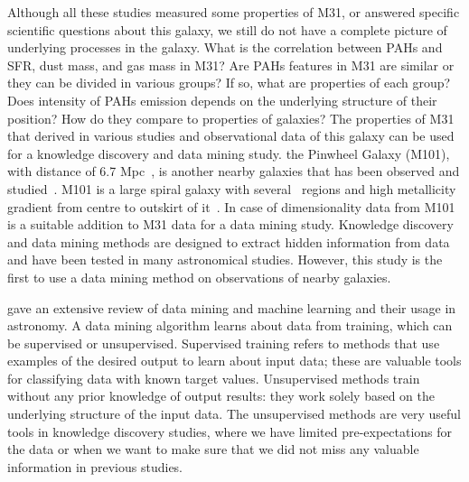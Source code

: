 Although all these studies measured some properties of M31, or answered specific scientific questions about this galaxy, we still do not have a complete picture of underlying processes in the galaxy.
What is the correlation between PAHs and SFR, dust mass, and gas mass in M31? 
Are PAHs features in M31 are similar or they can be divided in various groups? If so, what are properties of each group?
Does intensity of PAHs emission depends on the underlying structure of their position? 
How do they compare to properties of galaxies?
The properties of M31 that derived in various studies and observational data of this galaxy can be used for a knowledge discovery and data mining study.
the Pinwheel Galaxy (M101), with distance of 6.7 Mpc~\citep{Freedman01}, is another nearby galaxies that has been observed and studied~\citep[e.g][and references therein]{Kennicutt11,Dale09, Leroy08, Gordon08}.
M101 is a large spiral galaxy with several \hii~regions and high metallicity gradient from centre to outskirt of it~\citep{Kennicutt03}.
In case of dimensionality data from M101 is a suitable addition to M31 data for a data mining study.
Knowledge discovery and data mining methods are designed to extract hidden information from data and have been tested in many astronomical studies.
However, this study is the first to use a data mining method on observations of nearby galaxies.

\cite{Ball10} gave an extensive review of data mining and machine learning and their usage in astronomy.
A data mining algorithm learns about data from training, which can be supervised or unsupervised.
Supervised training refers to methods that use examples of the desired output to learn about input data; these are valuable tools for classifying data with known target values.
Unsupervised methods train without any prior knowledge of output results: 
they work solely based on the underlying structure of the input data.   
The unsupervised methods are very useful tools in knowledge discovery studies, where we have limited pre-expectations for the data or when we want to make sure that we did not miss any valuable information in previous studies.


